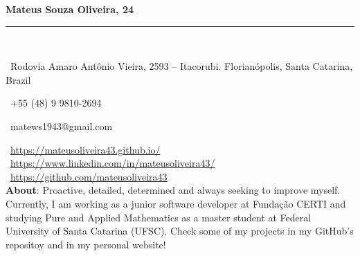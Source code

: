 \documentclass[a4paper,10pt]{article}
\makeatletter
\newcommand{\professional}{Mateus Souza Oliveira}
\newcommand{\age}{24}
\newcommand{\address}{Rodovia Amaro Antônio Vieira, 2593 -- Itacorubi. Florianópolis, Santa Catarina, Brazil}
\newcommand{\phone}{+55 (48) 9 9810-2694}
\newcommand{\email}{matews1943@gmail.com}
\newcommand{\about}{
    Proactive, detailed, determined and always seeking to improve myself. Currently, I am working as a junior software developer at Fundação CERTI and studying Pure and Applied Mathematics as a master student at Federal University of Santa Catarina (UFSC). Check some of my projects in my GitHub's repositoy and in my personal website!
	\vspace{2\baselineskip}
}
\makeatother
\begin{document}
	\noindent
	\hfill
	\begin{minipage}{0.65\linewidth}
		\Huge{\bf \professional, \age}\\\vspace{-1.75\baselineskip}
		
		\noindent\rule{\textwidth}{1.5pt} {\ }\\\vspace{-1.8\baselineskip}
		
		\large{
		\faMapMarker \ \address \\
		\begin{minipage}{0.5\linewidth}
			\faWhatsapp \ \phone
		\end{minipage}
		\begin{minipage}{0.5\linewidth}
			\faEnvelope \ \email
		\end{minipage}
		\faLink \ \url{https://mateusoliveira43.github.io/}\\
		\faLinkedinSquare \ \url{https://www.linkedin.com/in/mateusoliveira43/}\\
		\faGithub \ \url{https://github.com/mateusoliveira43} \\
		\vfill
		\textbf{About}: \about
		}
	\end{minipage}
\end{document}
